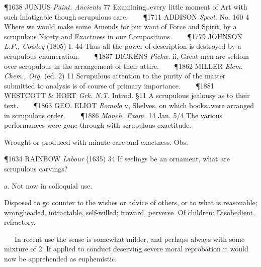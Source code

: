 \begin{description}[wide, labelwidth=!, labelindent=0pt]
\begin{myenumerate}
\P 1638 JUNIUS  \textit{Paint. Ancients} 77 Examining‥every little moment of Art with such infatigable though scrupulous care.    
\P 1711 ADDISON  \textit{Spect.} No. 160 4 Where we would make some Amends for our want of Force and Spirit, by a scrupulous Nicety and Exactness in our Compositions.    
\P 1779 JOHNSON  \textit{L.P., Cowley} (1805) I. 44 Thus all the power of description is destroyed by a scrupulous enumeration.    
\P 1837 DICKENS  \textit{Pickw.} ii, Great men are seldom over scrupulous in the arrangement of their attire.    
\P 1862 MILLER  \textit{Elem. Chem., Org.} (ed. 2) 11 Scrupulous attention to the purity of the matter submitted to analysis is of course of primary importance.    
\P 1881 WESTCOTT \& HORT  \textit{Grk. N.T.} Introd. §11 A scrupulous jealousy as to their text.    
\P 1863 GEO. ELIOT  \textit{Romola} v, Shelves, on which books‥were arranged in scrupulous order.    
\P 1886  \textit{Manch. Exam.} 14 Jan. 5/4 The various performances were gone through with scrupulous exactitude.

 Wrought or produced with minute care and exactness. Obs.

\P 1634 RAINBOW  \textit{Labour} (1635) 34 If seelings be an ornament, what are scrupulous carvings?
\end{myenumerate}


 a. Not now in colloquial use.

\noindent {}

\vspace{-0.3cm}

\begin{myenumerate}

 Disposed to go counter to the wishes or advice of others, or to what is reasonable; wrongheaded, intractable, self-willed; froward, perverse. Of children: Disobedient, refractory.

   In recent use the sense is somewhat milder, and perhaps always with some mixture of 2. If applied to conduct deserving severe moral reprobation it would now be apprehended as euphemistic.


\end{myenumerate}
\end{description}
